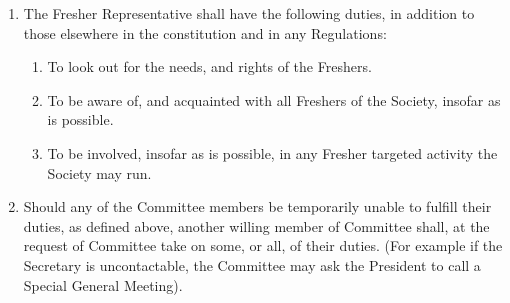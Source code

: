 \documentclass[a4paper]{article}
\begin{document}
\begin{enumerate}
    \item The Fresher Representative shall have the following duties, in addition to those elsewhere in the constitution and in any Regulations:
          \begin{enumerate}
              \item To look out for the needs, and rights of the Freshers.
              \item To be aware of, and acquainted with all Freshers of the Society, insofar as is possible.
              \item To be involved, insofar as is possible, in any Fresher targeted activity the Society may run.
          \end{enumerate}
    \item Should any of the Committee members be temporarily unable to fulfill their duties, as defined above, another willing member of Committee shall, at the request of Committee take on some, or all, of their duties. (For example if the Secretary is uncontactable, the Committee may ask the President to call a Special General Meeting).
\end{enumerate}
\end{document}
